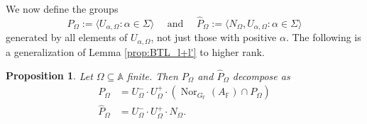 \documentclass[12pt]{amsart}
\newcommand{\F}{\mathbb{F} }
\newcommand{\A}{\mathbb{A}}
\numberwithin{equation}{section}
\newtheorem{proposition}[theorem]{Proposition}
\theoremstyle{remark} %
\begin{document}
		We now define the groups
		$$
		P_\Omega := \langle  U_{\alpha,\Omega} \colon \alpha \in \Sigma \rangle \quad \text{ and } \quad 
		\hat{P}_\Omega := \langle N_\Omega, U_{\alpha,\Omega}\colon \alpha \in \Sigma \rangle
		$$
		generated by all elements of $U_{\alpha, \Omega}$, not just those with positive $\alpha$. The following is a generalization of Lemma \ref{prop:BTL_l+l'} to higher rank.
		\begin{proposition}\label{prop:BTPOmegaUUN} %
			Let $\Omega \subseteq \A$ finite. Then $P_\Omega$ and $\hat{P}_\Omega$ decompose as
			\begin{align*}
				P_\Omega &= U_\Omega^- \cdot U_\Omega^+ \cdot(\operatorname{Nor}_{G_\F}(A_\F)\cap P_{\Omega}) \\
				\hat{P}_\Omega &= U_\Omega^- \cdot U_\Omega^+ \cdot N_{\Omega}.
			\end{align*}
		\end{proposition}
\end{document}
